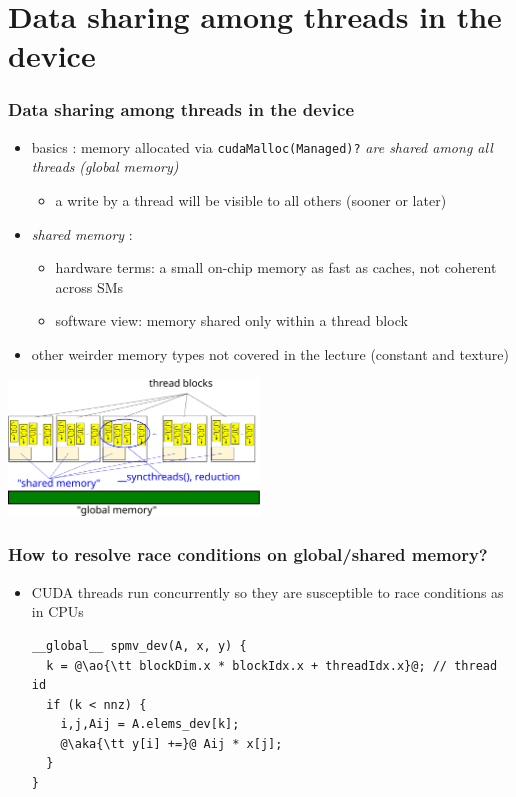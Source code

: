 \documentclass[12pt,dvipdfmx]{beamer}
\newcommand{\ao}[1]{{\color{blue}#1}}
\newcommand{\aka}[1]{{\color{red}#1}}
\begin{document}
\section{Data sharing among threads in the device}

\begin{frame}
\frametitle{Data sharing among threads in the device}
\begin{itemize}
\item basics :
  memory allocated via {\tt cudaMalloc(Managed)?}
  {\it are shared among all threads}
  \ao{\it (global memory)}
  \begin{itemize}
  \item a write by a thread will be visible to all others (sooner or later)
  \end{itemize}

\item \ao{\it shared memory} : 
  \begin{itemize}
  \item hardware terms: a small on-chip memory as fast as caches,
    not coherent across SMs
  \item software view:
    memory shared only within a thread block
  \end{itemize}

\item other weirder memory types not covered in the lecture
  (constant and texture)
\end{itemize}

\begin{center}
\includegraphics[width=0.5\textwidth]{out/pdf/svg/cuda_shmem_3.pdf}
\end{center}

\end{frame}

\begin{frame}[fragile]
\frametitle{How to resolve race conditions on global/shared memory?}
\begin{itemize}
\item CUDA threads run concurrently
  so they are susceptible to race conditions as in CPUs
\begin{lstlisting}
__global__ spmv_dev(A, x, y) {
  k = @\ao{\tt blockDim.x * blockIdx.x + threadIdx.x}@; // thread id
  if (k < nnz) {
    i,j,Aij = A.elems_dev[k];
    @\aka{\tt y[i] +=}@ Aij * x[j];
  }
}
\end{lstlisting}
\end{itemize}
\end{frame}
\end{document}
